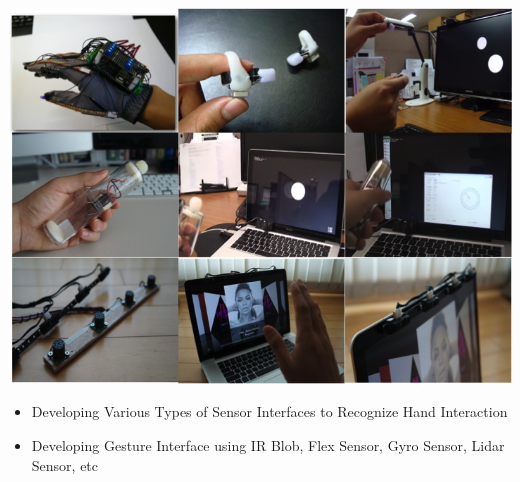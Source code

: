 \begin{cventries}
{\begin{cvitems}
{          \includegraphics[width=\linewidth]{cv/resources/gesturedevices.png}
          \begin{itemize}
            \item {Developing Various Types of Sensor Interfaces to Recognize Hand Interaction}
            \item {Developing Gesture Interface using IR Blob, Flex Sensor, Gyro Sensor, Lidar Sensor, etc}
          \end{itemize}
        }
      \end{cvitems} 
    }
\end{cventries}
